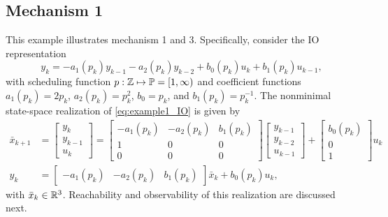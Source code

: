 \subsection{Mechanism 1}\label{sec:mechanism1}
This example illustrates mechanism 1 and 3. Specifically, consider the IO representation
\begin{equation}\label{eq:example1_IO}
    y_k = -a_1(p_k) y_{k-1} - a_2(p_k) y_{k-2} + b_0(p_k) u_k + b_1(p_k) u_{k-1},
\end{equation}
with scheduling function $p: \mathbb{Z} \mapsto \mathbb{P} = [1,\infty)$ and coefficient functions $a_1(p_k) = 2p_k$, $a_2(p_k) = p_k^2$, $b_0 = p_k$, and $b_1(p_k) = p_k^{-1}$.
The nonminimal state-space realization of \eqref{eq:example1_IO} is given by
\begin{subequations}\label{eq:example1_nonminSS}
\begin{align}
    \bar{x}_{k+1} &= \left[\begin{array}{c} y_k \\ y_{k-1} \\ \hline u_{k} \end{array}\right] = \left[\begin{array}{cc|c} -a_1(p_k) & -a_2(p_k) & b_1(p_k) \\ 1 & 0 & 0 \\ \hline 0 & 0 & 0 \end{array}\right] \left[\begin{array}{c}y_{k-1} \\ y_{k-2} \\ \hline u_{k-1}\end{array}\right] + \left[\begin{array}{c} b_0(p_k) \\ 0 \\ \hline 1 \end{array}\right] u_k \\
    y_k &= \left[\begin{array}{cc|c} -a_1(p_k) & -a_2(p_k) & b_1(p_k) \end{array}\right] \bar{x}_k + b_0(p_k) u_k,
\end{align}
\end{subequations}
with $\bar{x}_k \in \mathbb{R}^3$. Reachability and observability of this realization are discussed next.

